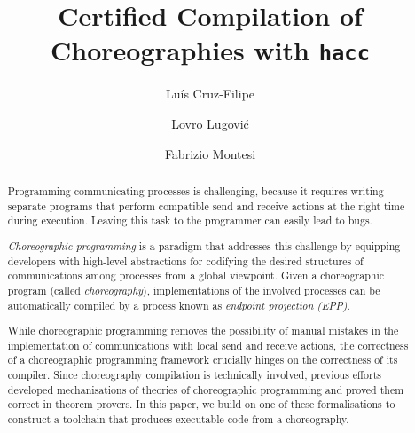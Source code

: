\documentclass[runningheads]{llncs}
\newcommand{\toolname}{\texttt{hacc}}
\begin{document}

\title{Certified Compilation of Choreographies with \toolname{}}


\author{
  Luís Cruz-Filipe  \and
  Lovro Lugović  \and
  Fabrizio Montesi 
}



\maketitle

\begin{abstract}
  Programming communicating processes is challenging, because it requires writing separate programs that perform compatible send and receive actions at the right time during execution.
  Leaving this task to the programmer can easily lead to bugs.

  \emph{Choreographic programming} is a paradigm that addresses this challenge by equipping developers with high-level abstractions for codifying the desired structures of communications among processes from a global viewpoint.
  Given a choreographic program (called \emph{choreography}), implementations of the involved processes can be automatically compiled by a process known as \emph{endpoint projection (EPP)}.

  While choreographic programming removes the possibility of manual mistakes in the implementation of communications with local send and receive actions, the correctness of a choreographic programming framework crucially hinges on the correctness of its compiler.
  Since choreography compilation is technically involved, previous efforts developed mechanisations of theories of choreographic programming and proved them correct in theorem provers.
  In this paper, we build on one of these formalisations to construct a toolchain that produces executable code from a choreography.

\end{abstract}
\end{document}
